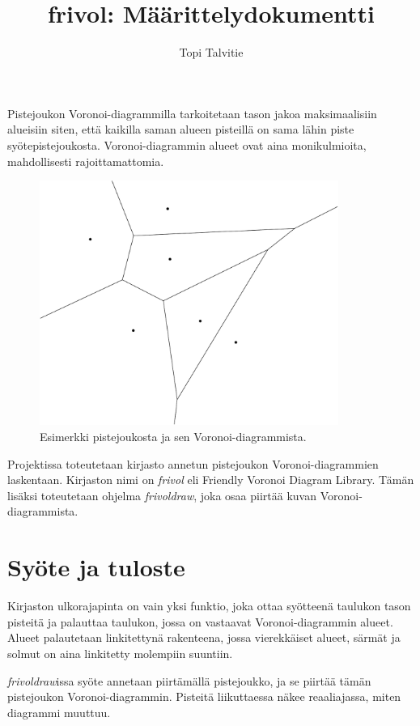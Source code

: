 \documentclass[a4paper, 11pt, finnish]{article}
\author{Topi Talvitie}
\title{frivol: Määrittelydokumentti}
\begin{document}
\maketitle

Pistejoukon Voronoi-diagrammilla tarkoitetaan tason jakoa maksimaalisiin alueisiin siten, että kaikilla saman alueen pisteillä on sama lähin piste syötepistejoukosta. Voronoi-diagrammin alueet ovat aina monikulmioita, mahdollisesti rajoittamattomia.

\begin{figure}[h]
\centering
\includegraphics[height=8cm]{esim-crop}
\caption{Esimerkki pistejoukosta ja sen Voronoi-diagrammista.}
\end{figure}

Projektissa toteutetaan kirjasto annetun pistejoukon Voronoi-diagrammien laskentaan. Kirjaston nimi on \emph{frivol} eli Friendly Voronoi Diagram Library. Tämän lisäksi toteutetaan ohjelma \emph{frivoldraw}, joka osaa piirtää kuvan Voronoi-diagrammista.

\section*{Syöte ja tuloste}
Kirjaston ulkorajapinta on vain yksi funktio, joka ottaa syötteenä taulukon tason pisteitä ja palauttaa taulukon, jossa on vastaavat Voronoi-diagrammin alueet. Alueet palautetaan linkitettynä rakenteena, jossa vierekkäiset alueet, särmät ja solmut on aina linkitetty molempiin suuntiin.

\emph{frivoldraw}issa syöte annetaan piirtämällä pistejoukko, ja se piirtää tämän pistejoukon Voronoi-diagrammin. Pisteitä liikuttaessa näkee reaaliajassa, miten diagrammi muuttuu.
\end{document}
